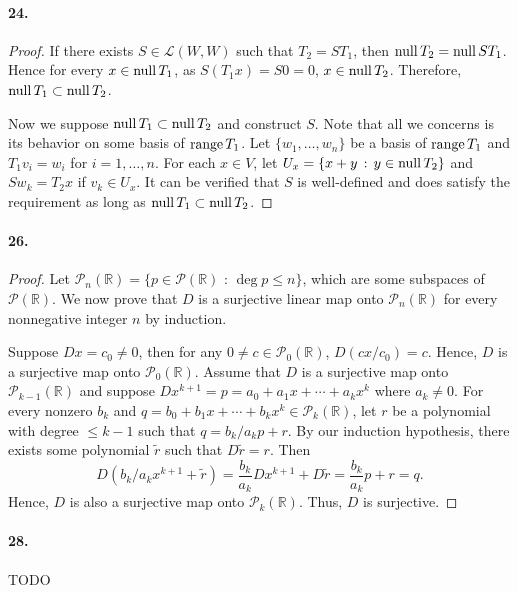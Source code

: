   \paragraph{24.}
  \begin{proof}
    If there exists $S\in\mathcal{L}(W,W)$ such that $T_2=ST_1$, then $\operatorname{null} T_2
    =\operatorname{null} ST_1$. Hence for every $x\in\operatorname{null} T_1$, as $S(T_1x)=S0 = 0$, $x\in\operatorname{null}
    T_2$. Therefore, $\operatorname{null} T_1\subset\operatorname{null} T_2$.\par
    Now we suppose $\operatorname{null} T_1\subset\operatorname{null} T_2$ and construct $S$. Note that all we
    concerns is its behavior on some basis of $\operatorname{range} T_1$. Let $\{w_1, \dots, 
    w_n\}$ be a basis of $\operatorname{range} T_1$ and $T_1v_i = w_i$ for $i=1,\dots,n$. For
    each $x\in V$, let $U_x = \{x+y\,:\,y\in\operatorname{null} T_2\}$ and $Sw_k=T_2x$ if $v_k
    \in U_x$. It can be verified that $S$ is well-defined and does satisfy the
    requirement as long as $\operatorname{null} T_1\subset\operatorname{null} T_2$.
  \end{proof}

  \paragraph{26.}
  \begin{proof}
    Let $\mathcal{P}_n(\mathbb{R})=\{p\in\mathcal{P}(\mathbb{R})\,\,:\,\deg p 
    \le n\}$, which are some subspaces of $\mathcal{P}(\mathbb{R})$. We now 
    prove that $D$ is a surjective linear map onto $\mathcal{P}_n(\mathbb{R})$
    for every nonnegative integer $n$ by induction. \par
    Suppose $Dx = c_0 \ne 0$, then for any $0\ne c\in\mathcal{P}_0(\mathbb{R})$,
    $D(cx / c_0) = c$. Hence, $D$ is a surjective map onto $\mathcal{P}_0
    (\mathbb{R})$. Assume that $D$ is a surjective map onto $\mathcal{P}_{k-1}
    (\mathbb{R})$ and suppose $Dx^{k+1} = p=a_0 + a_1x + \cdots + a_kx^k$ where
    $a_k\ne 0$. For every nonzero $b_k$ and $q = b_0+b_1x+\cdots+b_kx^k \in
    \mathcal{P}_k(\mathbb{R})$, let $r$ be a polynomial with degree $\le k-1$ 
    such that $q=b_k/a_k p + r$. By our induction hypothesis, there exists some 
    polynomial $\tilde{r}$ such that $D\tilde{r}=r$. Then
    \[
      D(b_k/a_k x^{k+1} + \tilde{r}) = \frac{b_k}{a_k}Dx^{k+1} + D\tilde{r} = 
      \frac{b_k}{a_k}p+r = q.
    \]
    Hence, $D$ is also a surjective map onto $\mathcal{P}_k(\mathbb{R})$. Thus,
    $D$ is surjective.
  \end{proof}

  \paragraph{28.} TODO

